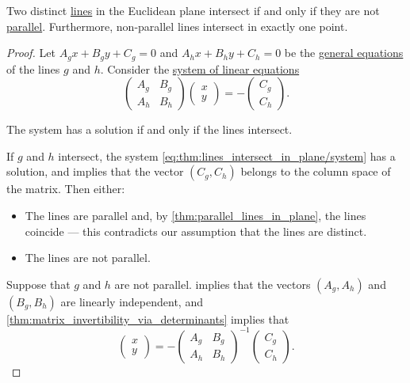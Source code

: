 \begin{proposition}\label{thm:lines_intersect_in_plane}
  Two distinct \hyperref[def:affine_line]{lines} in the Euclidean plane intersect if and only if they are not \hyperref[def:affine_parallelism]{parallel}. Furthermore, non-parallel lines intersect in exactly one point.
\end{proposition}
\begin{proof}
  Let \( A_g x + B_g y + C_g = 0 \) and \( A_h x + B_h y + C_h = 0 \) be the \hyperref[def:plane_line_equations/general]{general equations} of the lines \( g \) and \( h \). Consider the \hyperref[def:system_of_linear_equations]{system of linear equations}
  \begin{equation}\label{eq:thm:lines_intersect_in_plane/system}
    \begin{pmatrix}
      A_g & B_g \\
      A_h & B_h
    \end{pmatrix}
    \begin{pmatrix}
      x \\ y
    \end{pmatrix}
    =
    -
    \begin{pmatrix}
      C_g \\ C_h
    \end{pmatrix}.
  \end{equation}

  The system has a solution if and only if the lines intersect.

  \SufficiencySubProof If \( g \) and \( h \) intersect, the system \eqref{eq:thm:lines_intersect_in_plane/system} has a solution, and  implies that the vector \( (C_g, C_h) \) belongs to the column space of the matrix. Then either:
  \begin{itemize}
    \item The lines are parallel and, by \cref{thm:parallel_lines_in_plane}, the lines coincide --- this contradicts our assumption that the lines are distinct.
    \item The lines are not parallel.
  \end{itemize}

  \NecessitySubProof Suppose that \( g \) and \( h \) are not parallel.  implies that the vectors \( (A_g, A_h) \) and \( (B_g, B_h) \) are linearly independent, and \cref{thm:matrix_invertibility_via_determinants} implies that
  \begin{equation*}
    \begin{pmatrix}
      x \\ y
    \end{pmatrix}
    =
    -
    \begin{pmatrix}
      A_g & B_g \\
      A_h & B_h
    \end{pmatrix}^{-1}
    \begin{pmatrix}
      C_g \\ C_h
    \end{pmatrix}.
  \end{equation*}


\end{proof}
